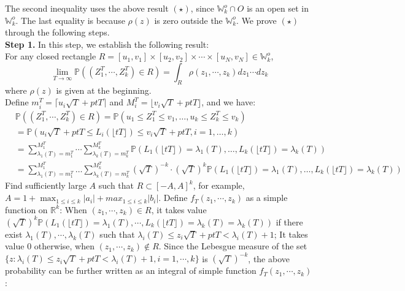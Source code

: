 \documentclass[12pt]{article}
\begin{document}
The second inequality uses the above result $(\star)$, since $\mathbb{W}_{k}^{o}\cap O$ is an open set in $\mathbb{W}_{k}^{o}$. The last equality is because $\rho(z)$ is zero outside the $\mathbb{W}_{k}^{o}$.
We prove $(\star)$ through the following steps.\\
\textbf{Step 1. }In this step, we establish the following result:\\
For any closed rectangle $R=[u_{1},v_{1}]\times [u_{2},v_{2}]\times\cdots\times[u_{N},v_{N}]\in\mathbb{W}_{k}^{o}$, 
$$\lim_{T\rightarrow\infty}\mathbb{P}((Z_{1}^{T},\cdots,Z_{k}^{T})\in R)=\int_{R}\rho(z_{1},\cdots,z_{k})dz_{1}\cdots dz_{k}$$
where $\rho(z)$ is given at the beginning.\\
Define $m_{i}^{T}=\lceil u_{i}\sqrt{T}+ptT\rceil$ and $M_{i}^{T}=\lfloor v_{i}\sqrt{T}+ptT\rfloor$, and we have:
\begin{align*}
&\mathbb{P}((Z_{1}^{T},\cdots,Z_{k}^{T})\in R)=\mathbb{P}(u_{1}\leqslant Z_{1}^{T} \leqslant v_{1}, \dots,  u_{k}\leqslant Z_{k}^{T} \leqslant v_{k})\\
&=\mathbb{P}(u_{i}\sqrt{T}+ptT\leqslant L_{i}(\lfloor tT\rfloor) \leqslant v_{i}\sqrt{T}+ptT, i=1,\dots, k)\\
&=\sum_{\lambda_{1}(T)=m_{1}^{T}}^{M_{1}^{T}}\cdots\sum_{\lambda_{k}(T)=m_{k}^{T}}^{M_{k}^{T}}\mathbb{P}(L_{1}(\lfloor tT \rfloor)=\lambda_{1}(T),\dots,L_{k}(\lfloor tT \rfloor)=\lambda_{k}(T))\\
&=\sum_{\lambda_{1}(T)=m_{1}^{T}}^{M_{1}^{T}}\dots\sum_{\lambda_{k}(T)=m_{k}^{T}}^{M_{k}^{T}}(\sqrt{T})^{-k}\cdot(\sqrt{T})^{k}\mathbb{P}(L_{1}(\lfloor tT \rfloor)=\lambda_{1}(T),\dots,L_{k}(\lfloor tT \rfloor)=\lambda_{k}(T))
\end{align*}
Find sufficiently large $A$ such that $R\subset[-A,A]^{k}$, for example, $A=1+\max_{1\leqslant i\leqslant k}|a_{i}|+max_{1\leqslant i\leqslant k}|b_{i}|$. Define $f_{T}(z_{1},\cdots,z_{k})$ as a simple function on $\mathbb{R}^{k}$: When $(z_{1},\cdots,z_{k})\in R$, it takes value $(\sqrt{T})^{k}\mathbb{P}(L_{1}(\lfloor tT \rfloor)=\lambda_{1}(T),\cdots,L_{k}(\lfloor tT \rfloor)=\lambda_{k}(T)=\lambda_{k}(T))$ if there exist $\lambda_{1}(T),\cdots,\lambda_{k}(T)$ such that $\lambda_{i}(T)\leqslant z_{i}\sqrt{T}+ptT<\lambda_{i}(T)+1$; It takes value $0$ otherwise, when $(z_{1},\cdots,z_{k})\notin R$.  Since the Lebesgue measure of the set $\{z:\lambda_{i}(T)\leqslant z_{i}\sqrt{T}+ptT<\lambda_{i}(T)+1,i=1,\cdots,k\}$ is $(\sqrt{T})^{-k}$, the above probability can be further written as an integral of simple function $f_{T}(z_{1},\cdots,z_{k})$:
\end{document}

